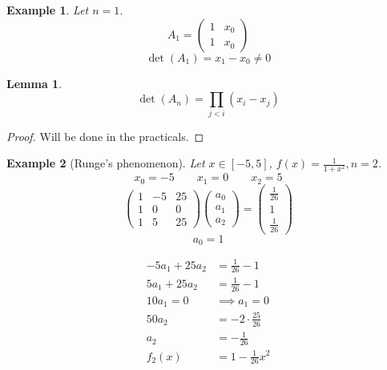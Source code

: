 \documentclass{article}
\newtheorem{example}{Example}
\newtheorem*{lemma}{Lemma}
\begin{document}
\begin{example}
  Let $n=1$.
  \[ A_1 = \begin{pmatrix} 1 & x_0 \\ 1 & x_0 \end{pmatrix} \]
  \[ \det(A_1) = x_1 - x_0 \neq 0 \]
\end{example}

\begin{lemma}
  \[ \det(A_n) = \prod_{j<i} (x_i - x_j) \]
\end{lemma}

\begin{proof}
  Will be done in the practicals.
\end{proof}

\begin{example}[Runge's phenomenon]
  Let $x \in [-5,5]$, $f(x) = \frac{1}{1 + x^2}, n=2$.
  \[ x_0 = -5 \qquad x_1 = 0 \qquad x_2 = 5 \]
  \[
    \begin{pmatrix}
      1 & -5 & 25 \\
      1 & 0 & 0 \\
      1 & 5 & 25
    \end{pmatrix}
    \begin{pmatrix}
      a_0 \\ a_1 \\ a_2
    \end{pmatrix}
    =
    \begin{pmatrix}
      \frac1{26} \\ 1 \\ \frac1{26}
    \end{pmatrix}
  \]
  \[ a_0 = 1 \]

  \begin{align*}
    -5a_1 + 25 a_2 &= \frac1{26} - 1 \\
    5a_1 + 25 a_2 &= \frac1{26} - 1 \\
  \hline
    10a_1 = 0 &\implies a_1 = 0 \\
    50 a_2 &= -2 \cdot \frac{25}{26} \\
    a_2 &= -\frac1{26}\\
    f_2(x) &= 1 - \frac1{26} x^2
  \end{align*}


\end{example}
\end{document}
